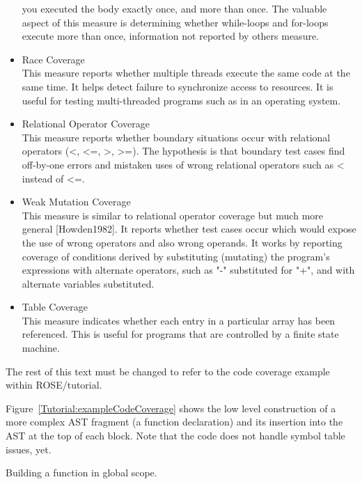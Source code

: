 \begin{itemize}
      you executed the body exactly once, and more than once. The valuable aspect of this
      measure is determining whether while-loops and for-loops execute more than once,
      information not reported by others measure.
   \item Race Coverage \\
      This measure reports whether multiple threads execute the same code at the same
      time. It helps detect failure to synchronize access to resources. It is useful for
      testing multi-threaded programs such as in an operating system.
   \item Relational Operator Coverage \\
      This measure reports whether boundary situations occur with relational operators (<,
      <=, >, >=). The hypothesis is that boundary test cases find off-by-one errors and
      mistaken uses of wrong relational operators such as < instead of <=. 
   \item Weak Mutation Coverage \\
      This measure is similar to relational operator coverage but much more general
      [Howden1982]. It reports whether test cases occur which would expose the use of wrong
      operators and also wrong operands. It works by reporting coverage of conditions
      derived by substituting (mutating) the program's expressions with alternate operators,
      such as "-" substituted for "+", and with alternate variables substituted.
   \item Table Coverage \\
      This measure indicates whether each entry in a particular array has been
      referenced. This is useful for programs that are controlled by a finite state machine.
\end{itemize}


   The rest of this text must be changed to refer to the code coverage example within ROSE/tutorial.

   Figure~\ref{Tutorial:exampleCodeCoverage} shows the low level
construction of a more complex AST fragment (a function declaration) and its insertion 
into the AST at the top of each block.  Note that the code does not handle 
symbol table issues, yet.

   Building a function in global scope.

